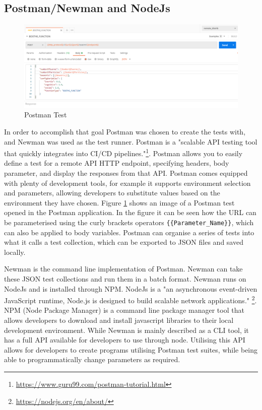 \documentclass[oneside,12pt]{book}
\begin{document}
\subsection{Postman/Newman and NodeJs}
\begin{figure}[H]
    \centering
    \includegraphics[scale=0.5]{Images/PostmanTest.png}
    \caption{Postman Test}
    \label{fig:PostmanTest}
\end{figure}
In order to accomplish that goal Postman was chosen to create the tests with, and Newman was used as the test runner. Postman is a "scalable API testing tool that quickly integrates into CI/CD pipelines."\footnote{\url{https://www.guru99.com/postman-tutorial.html}}. Postman allows you to easily define a test for a remote API HTTP endpoint, specifying headers, body parameter, and display the responses from that API. Postman comes equipped with plenty of development tools, for example it supports environment selection and parameters, allowing developers to substitute values based on the environment they have chosen. Figure \ref{fig:PostmanTest} shows an image of a Postman test opened in the Postman application. In the figure it can be seen how the URL can be parameterised using the curly brackets operators \verb|{{Parameter_Name}}|, which can also be applied to body variables.  Postman can organise a series of tests into what it calls a test collection, which can be exported to JSON files and saved locally. 


Newman is the command line implementation of Postman. Newman can take these JSON test collections and run them in a batch format. Newman runs on NodeJs and is installed through NPM. NodeJs is a "an asynchronous event-driven JavaScript runtime, Node.js is designed to build scalable network applications." \footnote{\url{https://nodejs.org/en/about/}}. NPM (Node Package Manager) is a command line package manager tool that allows developers to download and install javascript libraries to their local development environment. While Newman is mainly described as a CLI tool, it has a full API available for developers to use through node. Utilising this API allows for developers to create programs utilising Postman test suites, while being able to programmatically change parameters as required. 
\end{document}

